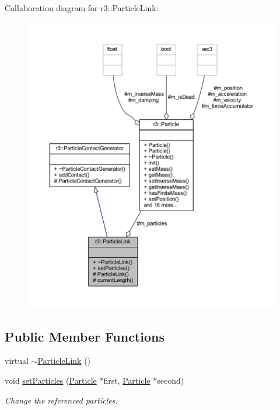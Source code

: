 Collaboration diagram for r3\+:\+:Particle\+Link\+:\nopagebreak
\begin{figure}[H]
\begin{center}
\leavevmode
\includegraphics[width=350pt]{classr3_1_1_particle_link__coll__graph}
\end{center}
\end{figure}
\subsection*{Public Member Functions}
\begin{DoxyCompactItemize}
\item 
virtual \mbox{\hyperlink{classr3_1_1_particle_link_a4477af9dbe9041010985492df2656e55}{$\sim$\+Particle\+Link}} ()
\item 
void \mbox{\hyperlink{classr3_1_1_particle_link_a6c199dcab0ac23674e0069e54bd841c4}{set\+Particles}} (\mbox{\hyperlink{classr3_1_1_particle}{Particle}} $\ast$first, \mbox{\hyperlink{classr3_1_1_particle}{Particle}} $\ast$second)
\begin{DoxyCompactList}\small\item\em Change the referenced particles. \end{DoxyCompactList}\end{DoxyCompactItemize}
